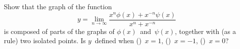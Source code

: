  Show that the graph of the function
\[
y = \lim_{n \to \infty} \frac{x^{n}\phi(x) + x^{-n}\psi(x)}{x^{n} + x^{-n}}
\]
is composed of parts of the graphs of $\phi(x)$~and~$\psi(x)$, together with (as a rule)
two isolated points. Is $y$~defined when (\ia)~$x = 1$, (\ib)~$x = -1$, (\ic)~$x = 0$?

